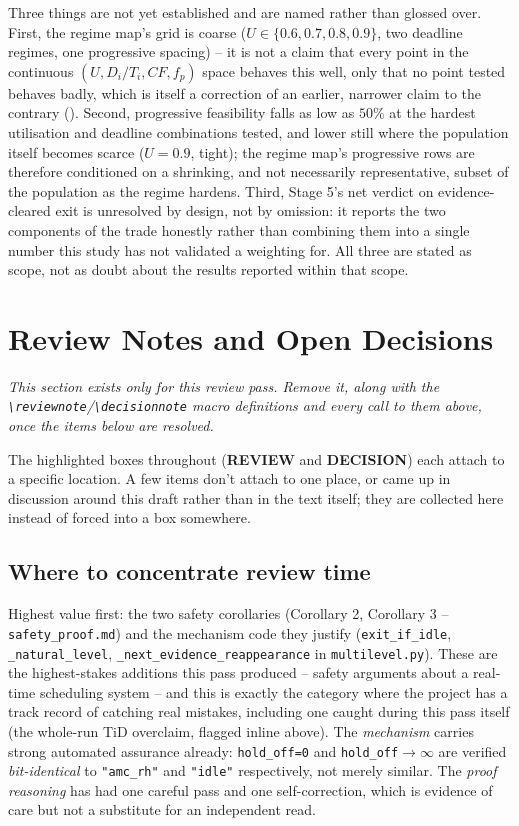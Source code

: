 Three things are not yet established and are named rather than glossed over.
First, the regime map's grid is coarse ($U \in \{0.6,0.7,0.8,0.9\}$, two
deadline regimes, one progressive spacing) -- it is not a claim that every
point in the continuous $(U, D_i/T_i, CF, f_p)$ space behaves this well, only
that no point tested behaves badly, which is itself a correction of an earlier,
narrower claim to the contrary (). Second,
progressive feasibility falls as low as $50\%$ at the hardest utilisation and
deadline combinations tested, and lower still where the population itself
becomes scarce ($U=0.9$, tight); the regime map's progressive rows are
therefore conditioned on a shrinking, and not necessarily representative,
subset of the population as the regime hardens. Third, Stage 5's net verdict
on evidence-cleared exit is unresolved by design, not by omission: it reports
the two components of the trade honestly rather than combining them into a
single number this study has not validated a weighting for. All three are
stated as scope, not as doubt about the results reported within that scope.

\section{Review Notes and Open Decisions}
\label{sec:review-notes}

\textit{This section exists only for this review pass. Remove it, along with the
\texttt{\textbackslash reviewnote}/\texttt{\textbackslash decisionnote} macro definitions and
every call to them above, once the items below are resolved.}

The highlighted boxes throughout 
(\textcolor{red!70!black}{\textbf{REVIEW}} and \textcolor{blue!60!black}{\textbf{DECISION}}) each
attach to a specific location. A few items don't attach to one place, or came up in discussion
around this draft rather than in the text itself; they are collected here instead of forced into
a box somewhere.

\subsection{Where to concentrate review time}

Highest value first: the two safety corollaries (Corollary 2, Corollary 3 --
\texttt{safety\_proof.md}) and the mechanism code they justify
(\texttt{exit\_if\_idle}, \texttt{\_natural\_level}, \texttt{\_next\_evidence\_reappearance} in
\texttt{multilevel.py}). These are the highest-stakes additions this pass produced -- safety
arguments about a real-time scheduling system -- and this is exactly the category where the
project has a track record of catching real mistakes, including one caught during this pass
itself (the whole-run TiD overclaim, flagged inline above). The \emph{mechanism} carries strong
automated assurance already: \texttt{hold\_off=0} and \texttt{hold\_off}$\to\infty$ are verified
\emph{bit-identical} to \texttt{"amc\_rh"} and \texttt{"idle"} respectively, not merely similar.
The \emph{proof reasoning} has had one careful pass and one self-correction, which is evidence of
care but not a substitute for an independent read.

